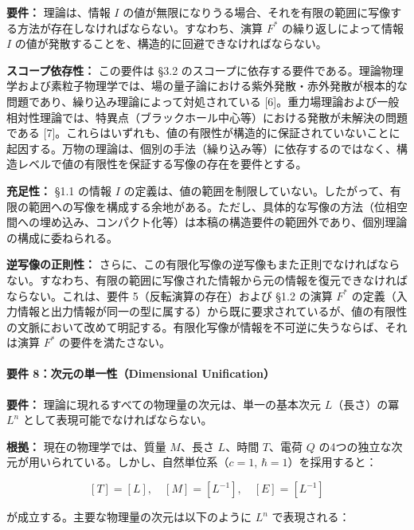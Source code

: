 \documentclass[a4paper,11pt]{ltjsarticle}
\begin{document}
\textbf{要件：} 理論は、情報 \(I\)
の値が無限になりうる場合、それを有限の範囲に写像する方法が存在しなければならない。すなわち、演算
\(F^*\) の繰り返しによって情報 \(I\)
の値が発散することを、構造的に回避できなければならない。

\textbf{スコープ依存性：} この要件は §3.2
のスコープに依存する要件である。理論物理学および素粒子物理学では、場の量子論における紫外発散・赤外発散が根本的な問題であり、繰り込み理論によって対処されている
{[}6{]}。重力場理論および一般相対性理論では、特異点（ブラックホール中心等）における発散が未解決の問題である
{[}7{]}。これらはいずれも、値の有限性が構造的に保証されていないことに起因する。万物の理論は、個別の手法（繰り込み等）に依存するのではなく、構造レベルで値の有限性を保証する写像の存在を要件とする。

\textbf{充足性：} §1.1 の情報 \(I\)
の定義は、値の範囲を制限していない。したがって、有限の範囲への写像を構成する余地がある。ただし、具体的な写像の方法（位相空間への埋め込み、コンパクト化等）は本稿の構造要件の範囲外であり、個別理論の構成に委ねられる。

\textbf{逆写像の正則性：}
さらに、この有限化写像の逆写像もまた正則でなければならない。すなわち、有限の範囲に写像された情報から元の情報を復元できなければならない。これは、要件
5（反転演算の存在）および §1.2 の演算 \(F^*\)
の定義（入力情報と出力情報が同一の型に属する）から既に要求されているが、値の有限性の文脈において改めて明記する。有限化写像が情報を不可逆に失うならば、それは演算
\(F^*\) の要件を満たさない。

\paragraph{要件 8：次元の単一性（Dimensional
Unification）}\label{ux8981ux4ef6-8ux6b21ux5143ux306eux5358ux4e00ux6027dimensional-unification}

\textbf{要件：} 理論に現れるすべての物理量の次元は、単一の基本次元
\(L\)（長さ）の冪 \(L^n\) として表現可能でなければならない。

\textbf{根拠：} 現在の物理学では、質量 \(M\)、長さ \(L\)、時間
\(T\)、電荷 \(Q\)
の4つの独立な次元が用いられている。しかし、自然単位系（\(c = 1\),
\(\hbar = 1\)）を採用すると：

\[[T] = [L], \quad [M] = [L^{-1}], \quad [E] = [L^{-1}]\]

が成立する。主要な物理量の次元は以下のように \(L^n\) で表現される：
\end{document}
